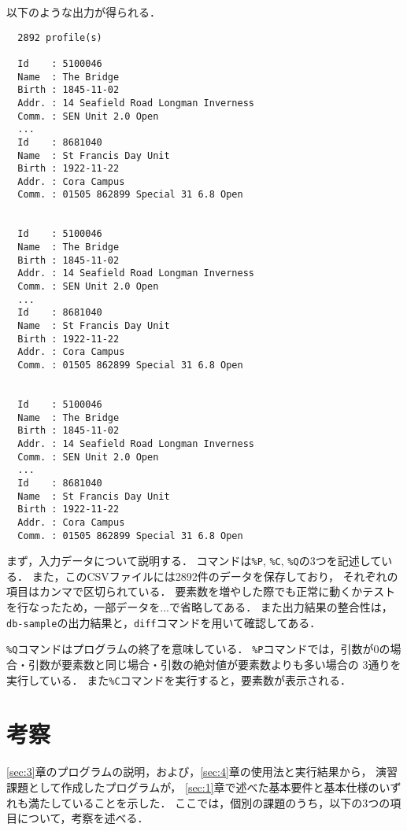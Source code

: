 \documentclass[autodetect-engine,dvi=dvipdfmx,ja=standard,
               a4j,11pt]{bxjsarticle}
\begin{document}
\noindent
以下のような出力が得られる．

{\fontsize{10pt}{11pt} \selectfont
 \begin{verbatim}
  2892 profile(s)

  Id    : 5100046
  Name  : The Bridge
  Birth : 1845-11-02
  Addr. : 14 Seafield Road Longman Inverness
  Comm. : SEN Unit 2.0 Open
  ...
  Id    : 8681040
  Name  : St Francis Day Unit
  Birth : 1922-11-22
  Addr. : Cora Campus
  Comm. : 01505 862899 Special 31 6.8 Open


  Id    : 5100046
  Name  : The Bridge
  Birth : 1845-11-02
  Addr. : 14 Seafield Road Longman Inverness
  Comm. : SEN Unit 2.0 Open
  ...
  Id    : 8681040
  Name  : St Francis Day Unit
  Birth : 1922-11-22
  Addr. : Cora Campus
  Comm. : 01505 862899 Special 31 6.8 Open


  Id    : 5100046
  Name  : The Bridge
  Birth : 1845-11-02
  Addr. : 14 Seafield Road Longman Inverness
  Comm. : SEN Unit 2.0 Open
  ...
  Id    : 8681040
  Name  : St Francis Day Unit
  Birth : 1922-11-22
  Addr. : Cora Campus
  Comm. : 01505 862899 Special 31 6.8 Open

 \end{verbatim}
}

まず，入力データについて説明する．
コマンドは\verb|%P|, \verb|%C|, \verb|%Q|の3つを記述している．
また，このCSVファイルには2892件のデータを保存しており，
それぞれの項目はカンマで区切られている．
要素数を増やした際でも正常に動くかテストを行なったため，一部データを...で省略してある．
また出力結果の整合性は，\verb|db-sample|の出力結果と，\verb|diff|コマンドを用いて確認してある．

\verb|%Q|コマンドはプログラムの終了を意味している．
\verb|%P|コマンドでは，引数が0の場合・引数が要素数と同じ場合・引数の絶対値が要素数よりも多い場合の
3通りを実行している．
また\verb|%C|コマンドを実行すると，要素数が表示される．


\section{考察} \label{sec:5}

\ref{sec:3}章のプログラムの説明，および，\ref{sec:4}章の使用法と実行結果から，
演習課題として作成したプログラムが，
\ref{sec:1}章で述べた基本要件と基本仕様のいずれも満たしていることを示した．
ここでは，個別の課題のうち，以下の3つの項目について，考察を述べる．
\end{document}
